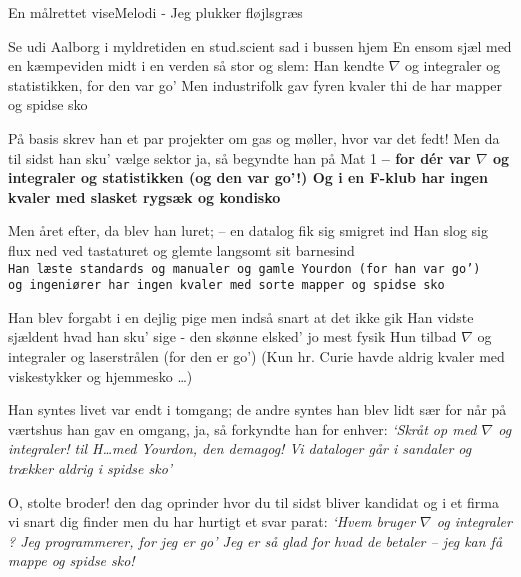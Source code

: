 \begin{sang}{En målrettet vise}{Melodi - Jeg plukker fløjlsgræs}
\begin{vers}
Se udi Aalborg i myldretiden
en stud.scient sad i bussen hjem
En ensom sjæl med en kæmpeviden
midt i en verden så stor og slem:
{\sf Han kendte $\nabla$ og integraler
og statistikken, for den var go'
Men industrifolk gav fyren kvaler
thi de har mapper og spidse sko}
\end{vers}
\begin{vers}
På basis skrev han et par projekter
om gas og møller, hvor var det fedt!
Men da til sidst han sku' vælge sektor
ja, så begyndte han på Mat 1
{\bf -- for d\'{e}r var $\nabla$ og integraler
og statistikken (og den var go'!)
Og i en F-klub har ingen kvaler
med slasket rygsæk og kondisko }
\end{vers}
\begin{vers}
Men året efter, da blev han luret;
-- en datalog fik sig smigret ind
Han slog sig flux ned ved tastaturet
og glemte langsomt sit barnesind \vspace{0.5mm}
{\tt \small Han~læste~standards~og~manualer \vspace{0.5mm}
og~gamle~Yourdon~(for~han~var~go') 
og~ingeniører~har~ingen~kvaler \vspace{0.5mm}
med~sorte~mapper~og~spidse~sko} 
\end{vers}
\vbox{}\vfill
\begin{vers}
Han blev forgabt i en dejlig pige
men indså snart at det ikke gik
Han vidste sjældent hvad han sku' sige
- den skønne elsked' jo mest fysik
{\sc Hun tilbad $\nabla$ og integraler
og laserstrålen (for den er go')
(Kun hr. Curie havde aldrig kvaler
med viskestykker og hjemmesko \ldots)}
\end{vers}
\begin{vers}
Han syntes livet var endt i tomgang;
de andre syntes han blev lidt sær
for når på værtshus han gav en omgang,
ja, så forkyndte han for enhver:
{\sl `Skråt op med $\nabla$ og integraler!
til H\ldots med Yourdon, den demagog!
Vi dataloger går i sandaler
og trækker {\em aldrig} i spidse sko'}
\end{vers}
\begin{vers}
O, stolte broder! den dag oprinder
hvor du til sidst bliver kandidat
og i et firma vi snart dig finder
men du har hurtigt et svar parat: 
{\em `Hvem bruger $\nabla$ og integraler ?
Jeg programmerer, for jeg er go'
Jeg er så glad for hvad de betaler
-- jeg kan få mappe og spidse sko!}

\end{vers}
\laps
\end{sang}
